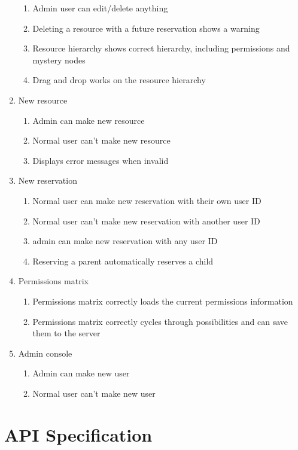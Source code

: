 \documentclass[12pt]{article}
\begin{document}
\begin{enumerate}
\begin{enumerate}
        \item Admin user can edit/delete anything
        \item Deleting a resource with a future reservation shows a warning
        \item Resource hierarchy shows correct hierarchy, including permissions and mystery nodes
        \item Drag and drop works on the resource hierarchy
    \end{enumerate}
    \item New resource
    \begin{enumerate}
        \item Admin can make new resource
        \item Normal user can't make new resource
        \item Displays error messages when invalid
    \end{enumerate}
    \item New reservation
    \begin{enumerate}
        \item Normal user can make new reservation with their own user ID
        \item Normal user can't make new reservation with another user ID
        \item admin can make new reservation with any user ID
        \item Reserving a parent automatically reserves a child
    \end{enumerate}
    \item Permissions matrix
    \begin{enumerate}
        \item Permissions matrix correctly loads the current permissions information
        \item Permissions matrix correctly cycles through possibilities and can save them to the server
    \end{enumerate}
    \item Admin console
    \begin{enumerate}
        \item Admin can make new user
        \item Normal user can't make new user
    \end{enumerate}
\end{enumerate}

\clearpage
\section{API Specification}
\label{appendix:apispec}
\end{document}

